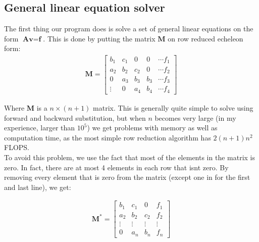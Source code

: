 \documentclass[a4paper,12pt,norsk]{article}
\begin{document}
	\subsection{General linear equation solver}
	The first thing our program does is solve a set of general linear equations on the form $\textbf{A}\textbf{v} = \textbf{f}$. This is done by putting the matrix $\textbf{M}$ on row reduced echeleon form:
	\begin{gather*}
	\textbf{M} =  \left[
	\begin{array}{cccccc}
	b_1 & c_1 & 0 & 0 & \cdots f_1\\
	a_2 & b_2 & c_2 & 0 & \cdots f_2\\
	0 & a_3 & b_3 & b_3 & \cdots f_3\\
	\vdots & 0 & a_4 & b_4 & \cdots f_4
	\end{array}
	\right]
	\end{gather*}

	Where $\textbf{M}$ is a $n \times (n+1)$ matrix. This is generally quite simple to solve using forward and backward substitution, but when $n$ becomes very large (in my experience, larger than $10^5$) we get problems with memory as well as computation time, as the most simple row reduction algorithm has $2(n+1)n^2$ FLOPS.\\
	To avoid this problem, we use the fact that most of the elements in the matrix is zero. In fact, there are at most 4 elements in each row that isnt zero. By removing every element that is zero from the matrix (except one in for the first and last line), we get:

\begin{gather*}
	\textbf{M}^* = \left[
	\begin{array}{cccc}
	b_1 & c_1 & 0 & f_1\\
	a_2 & b_2 & c_2 & f_2\\
	\vdots & \vdots & \vdots & \vdots\\
	0 & a_n & b_n & f_n
	\end{array}
	\right]
	\end{gather*}
\end{document}
